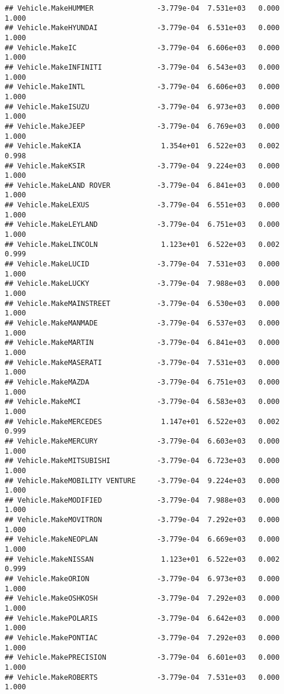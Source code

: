 \documentclass[
]{article}
\begin{document}
\begin{verbatim}
## Vehicle.MakeHUMMER               -3.779e-04  7.531e+03   0.000    1.000
## Vehicle.MakeHYUNDAI              -3.779e-04  6.531e+03   0.000    1.000
## Vehicle.MakeIC                   -3.779e-04  6.606e+03   0.000    1.000
## Vehicle.MakeINFINITI             -3.779e-04  6.543e+03   0.000    1.000
## Vehicle.MakeINTL                 -3.779e-04  6.606e+03   0.000    1.000
## Vehicle.MakeISUZU                -3.779e-04  6.973e+03   0.000    1.000
## Vehicle.MakeJEEP                 -3.779e-04  6.769e+03   0.000    1.000
## Vehicle.MakeKIA                   1.354e+01  6.522e+03   0.002    0.998
## Vehicle.MakeKSIR                 -3.779e-04  9.224e+03   0.000    1.000
## Vehicle.MakeLAND ROVER           -3.779e-04  6.841e+03   0.000    1.000
## Vehicle.MakeLEXUS                -3.779e-04  6.551e+03   0.000    1.000
## Vehicle.MakeLEYLAND              -3.779e-04  6.751e+03   0.000    1.000
## Vehicle.MakeLINCOLN               1.123e+01  6.522e+03   0.002    0.999
## Vehicle.MakeLUCID                -3.779e-04  7.531e+03   0.000    1.000
## Vehicle.MakeLUCKY                -3.779e-04  7.988e+03   0.000    1.000
## Vehicle.MakeMAINSTREET           -3.779e-04  6.530e+03   0.000    1.000
## Vehicle.MakeMANMADE              -3.779e-04  6.537e+03   0.000    1.000
## Vehicle.MakeMARTIN               -3.779e-04  6.841e+03   0.000    1.000
## Vehicle.MakeMASERATI             -3.779e-04  7.531e+03   0.000    1.000
## Vehicle.MakeMAZDA                -3.779e-04  6.751e+03   0.000    1.000
## Vehicle.MakeMCI                  -3.779e-04  6.583e+03   0.000    1.000
## Vehicle.MakeMERCEDES              1.147e+01  6.522e+03   0.002    0.999
## Vehicle.MakeMERCURY              -3.779e-04  6.603e+03   0.000    1.000
## Vehicle.MakeMITSUBISHI           -3.779e-04  6.723e+03   0.000    1.000
## Vehicle.MakeMOBILITY VENTURE     -3.779e-04  9.224e+03   0.000    1.000
## Vehicle.MakeMODIFIED             -3.779e-04  7.988e+03   0.000    1.000
## Vehicle.MakeMOVITRON             -3.779e-04  7.292e+03   0.000    1.000
## Vehicle.MakeNEOPLAN              -3.779e-04  6.669e+03   0.000    1.000
## Vehicle.MakeNISSAN                1.123e+01  6.522e+03   0.002    0.999
## Vehicle.MakeORION                -3.779e-04  6.973e+03   0.000    1.000
## Vehicle.MakeOSHKOSH              -3.779e-04  7.292e+03   0.000    1.000
## Vehicle.MakePOLARIS              -3.779e-04  6.642e+03   0.000    1.000
## Vehicle.MakePONTIAC              -3.779e-04  7.292e+03   0.000    1.000
## Vehicle.MakePRECISION            -3.779e-04  6.601e+03   0.000    1.000
## Vehicle.MakeROBERTS              -3.779e-04  7.531e+03   0.000    1.000

\end{verbatim}
\end{document}
